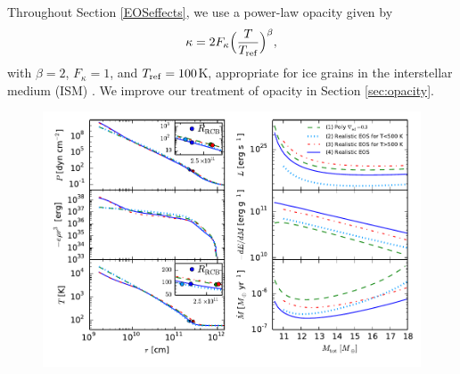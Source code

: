 Throughout Section \ref{EOSeffects}, we use a power-law opacity given by
\begin{equation}
\label{eq:opacitylaw}
\kappa=2 F_{\kappa} \Big(\frac{T}{T_{\rm ref}}\Big)^{\beta},
\end{equation}  
\noindent with $\beta =2$, $F_{\kappa} = 1$, and $T_{\rm{ref}}=100$K, appropriate for ice grains in the interstellar medium (ISM) \citep{bell94}.  We improve our treatment of opacity in Section \ref{sec:opacity}.


\begin{figure}[H]
\centering
\includegraphics[width=\textwidth]{figures/all_plot_test.pdf}
\caption{
}
\end{figure}
